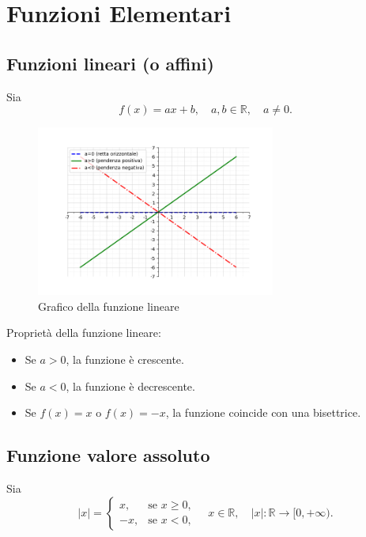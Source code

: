 \documentclass[oneside,10pt]{book} %
\begin{document}
\section{Funzioni Elementari}
\subsection{Funzioni lineari (o affini)}

Sia 
\[
f(x) = a x + b, \quad a, b \in \mathbb{R}, \quad a \neq 0.
\]

\begin{figure}[h]
    \centering
    \includegraphics[width=0.7\textwidth]{./img/lineari_combinato.png}
    \caption{Grafico della funzione lineare}
    \label{fig:funzione_lineare}
\end{figure}

Proprietà della funzione lineare:
\begin{itemize}
    \item Se $a > 0$, la funzione è crescente.
    \item Se $a < 0$, la funzione è decrescente.
    \item Se $f(x) = x$ o $f(x) = -x$, la funzione coincide con una bisettrice.
\end{itemize}

\subsection{Funzione valore assoluto}

Sia
\[
|x| = 
\begin{cases} 
x, & \text{se } x \ge 0, \\
-x, & \text{se } x < 0,
\end{cases}
\quad x \in \mathbb{R}, \quad |x| : \mathbb{R} \to [0, +\infty).
\]
\end{document}

